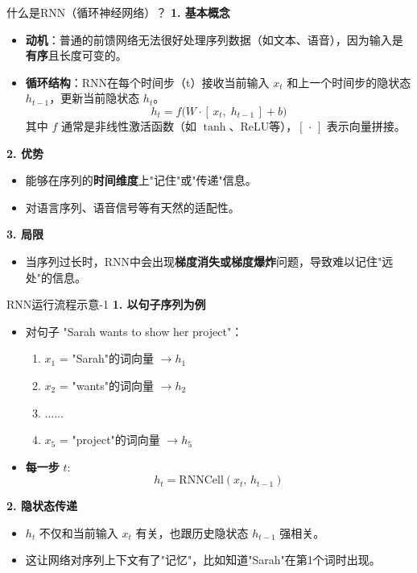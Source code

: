 \documentclass{beamer}
\begin{document}
\begin{frame}{什么是RNN（循环神经网络）？}
  \textbf{1. 基本概念}
  \begin{itemize}
    \item \textbf{动机}：普通的前馈网络无法很好处理序列数据（如文本、语音），因为输入是\textbf{有序}且长度可变的。
    \item \textbf{循环结构}：RNN在每个时间步（t）接收当前输入 \(x_t\) 和上一个时间步的隐状态 \(h_{t-1}\)，更新当前隐状态 \(h_t\)。  
    \[
      h_t = f\bigl(W \cdot [\,x_t,\;h_{t-1}\,] + b\bigr)
    \]
    其中 \(f\) 通常是非线性激活函数（如 \(\tanh\)、ReLU等），\([\,\cdot\,]\) 表示向量拼接。
  \end{itemize}
  
  \textbf{2. 优势}
  \begin{itemize}
    \item 能够在序列的\textbf{时间维度}上"记住"或"传递"信息。
    \item 对语言序列、语音信号等有天然的适配性。
  \end{itemize}
  
  \textbf{3. 局限}
  \begin{itemize}
    \item 当序列过长时，RNN中会出现\textbf{梯度消失或梯度爆炸}问题，导致难以记住"远处"的信息。
  \end{itemize}
\end{frame}



\begin{frame}{RNN运行流程示意-1}
  \textbf{1. 以句子序列为例}
  \begin{itemize}
    \item 对句子 "Sarah wants to show her project"：
      \begin{enumerate}
        \item \(x_1\) = "Sarah"的词向量 \(\to h_1\)
        \item \(x_2\) = "wants"的词向量 \(\to h_2\)
        \item \(\dots \dots\)
        \item \(x_5\) = "project"的词向量 \(\to h_5\)
      \end{enumerate}
    \item \textbf{每一步} \(t\):
    \[
      h_t = \mathrm{RNNCell}(x_t,\, h_{t-1})
    \]
  \end{itemize}
  
  \textbf{2. 隐状态传递}
  \begin{itemize}
    \item \(h_t\) 不仅和当前输入 \(x_t\) 有关，也跟历史隐状态 \(h_{t-1}\) 强相关。
    \item 这让网络对序列上下文有了"记忆"，比如知道"Sarah"在第1个词时出现。
  \end{itemize}
\end{frame}
\end{document}
